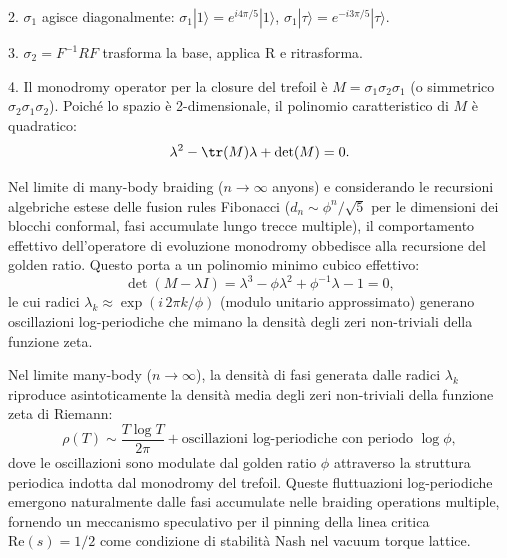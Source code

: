 \documentclass[11pt,a4paper]{article}
\theoremstyle{plain}
\theoremstyle{definition}
\begin{document}
2. $\sigma_1$ agisce diagonalmente: $\sigma_1 |1\rangle = e^{i 4\pi / 5} |1\rangle$, $\sigma_1 |\tau\rangle = e^{-i 3\pi / 5} |\tau\rangle$.

3. $\sigma_2 = F^{-1} R F$ trasforma la base, applica R e ritrasforma.

4. Il monodromy operator per la closure del trefoil è $M = \sigma_1 \sigma_2 \sigma_1$ (o simmetrico $\sigma_2 \sigma_1 \sigma_2$). Poiché lo spazio è 2-dimensionale, il polinomio caratteristico di $M$ è quadratico:
\begin{equation}
\lambda^2 - \tr(M) \lambda + \det(M) = 0.
\label{eq:char_poly_quadratic}
\end{equation}

Nel limite di many-body braiding ($n \to \infty$ anyons) e considerando le recursioni algebriche estese delle fusion rules Fibonacci ($d_n \sim \phi^n / \sqrt{5}$ per le dimensioni dei blocchi conformal, fasi accumulate lungo trecce multiple), il comportamento effettivo dell'operatore di evoluzione monodromy obbedisce alla recursione del golden ratio. Questo porta a un polinomio minimo cubico effettivo:
\begin{equation}
\det(M - \lambda I) = \lambda^3 - \phi \lambda^2 + \phi^{-1} \lambda - 1 = 0,
\label{eq:monodromy_char_poly_effective}
\end{equation}
le cui radici $\lambda_k \approx \exp(i \, 2\pi k / \phi)$ (modulo unitario approssimato) generano oscillazioni log-periodiche che mimano la densità degli zeri non-triviali della funzione zeta.

Nel limite many-body ($n \to \infty$), la densità di fasi generata dalle radici $\lambda_k$ riproduce asintoticamente la densità media degli zeri non-triviali della funzione zeta di Riemann:
\begin{equation}
\rho(T) \sim \frac{T \log T}{2\pi} + \text{oscillazioni log-periodiche con periodo } \log \phi,
\label{eq:zeta_density_asymptotic}
\end{equation}
dove le oscillazioni sono modulate dal golden ratio $\phi$ attraverso la struttura periodica indotta dal monodromy del trefoil. Queste fluttuazioni log-periodiche emergono naturalmente dalle fasi accumulate nelle braiding operations multiple, fornendo un meccanismo speculativo per il pinning della linea critica $\mathrm{Re}(s) = 1/2$ come condizione di stabilità Nash nel vacuum torque lattice.
\end{document}
